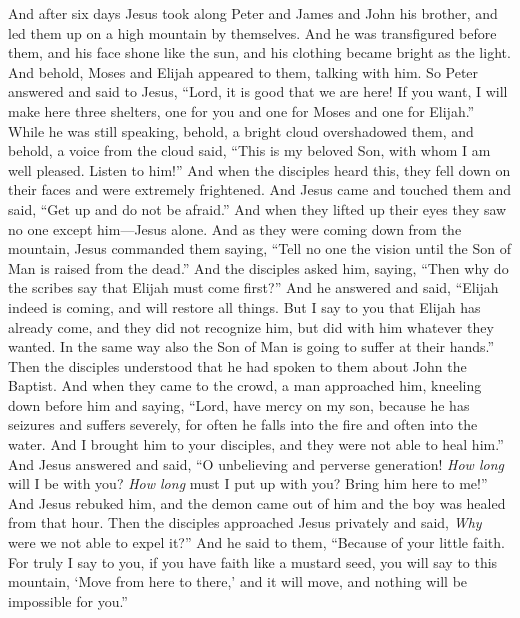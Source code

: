 \begin{biblechapter} %
 And after six days Jesus took along Peter and James and John his brother, and led them up on a high mountain by themselves.
\verse And he was transfigured before them, and his face shone like the sun, and his clothing became bright as the light.
\verse And behold, Moses and Elijah appeared to them, talking with him.
\verse So Peter answered and said to Jesus, “Lord, it is good that we are here! If you want, I will make here three shelters, one for you and one for Moses and one for Elijah.”
\verse While he was still speaking, behold, a bright cloud overshadowed them, and behold, a voice from the cloud said, “This is my beloved Son, with whom I am well pleased. Listen to him!”
\verse And when the disciples heard this, they fell down on their faces and were extremely frightened.
\verse And Jesus came and touched them and said, “Get up and do not be afraid.”
\verse And when they lifted up their eyes they saw no one except him—Jesus alone.
\verse And as they were coming down from the mountain, Jesus commanded them saying, “Tell no one the vision until the Son of Man is raised from the dead.”
\verse And the disciples asked him, saying, “Then why do the scribes say that Elijah must come first?”
\verse And he answered and said, “Elijah indeed is coming, and will restore all things.
\verse But I say to you that Elijah has already come, and they did not recognize him, but did with him whatever they wanted. In the same way also the Son of Man is going to suffer at their hands.”
\verse Then the disciples understood that he had spoken to them about John the Baptist.
 And when they came to the crowd, a man approached him, kneeling down before him
\verse and saying, “Lord, have mercy on my son, because he has seizures and suffers severely, for often he falls into the fire and often into the water.
\verse And I brought him to your disciples, and they were not able to heal him.”
\verse And Jesus answered and said, “O unbelieving and perverse generation! \textit{How long} will I be with you? \textit{How long} must I put up with you? Bring him here to me!”
\verse And Jesus rebuked him, and the demon came out of him and the boy was healed from that hour.
\verse Then the disciples approached Jesus privately and said, \textit{Why} were we not able to expel it?”
\verse And he said to them, “Because of your little faith. For truly I say to you, if you have faith like a mustard seed, you will say to this mountain, ‘Move from here to there,’ and it will move, and nothing will be impossible for you.”

\end{biblechapter}
